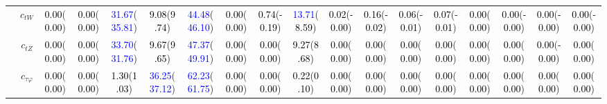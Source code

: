 \documentclass{article}
\begin{document}
\begin{landscape}
\begin{table}[H]
\begin{tabular}{|c|c|c|c|c|c|c|c|c|c|c|c|c|c|c|c|c|c|}
 & $c_{tW}$ & \textcolor{black}{0.00}(\textcolor{black}{0.00}) & \textcolor{black}{0.00}(\textcolor{black}{0.00}) & \textcolor{blue}{31.67}(\textcolor{blue}{35.81}) & \textcolor{black}{9.08}(\textcolor{black}{9.74}) & \textcolor{blue}{44.48}(\textcolor{blue}{46.10}) & \textcolor{black}{0.00}(\textcolor{black}{0.00}) & \textcolor{black}{0.74}(\textcolor{black}{-0.19}) & \textcolor{blue}{13.71}(\textcolor{black}{8.59}) & \textcolor{black}{0.02}(\textcolor{black}{-0.00}) & \textcolor{black}{0.16}(\textcolor{black}{-0.02}) & \textcolor{black}{0.06}(\textcolor{black}{-0.01}) & \textcolor{black}{0.07}(\textcolor{black}{-0.01}) & \textcolor{black}{0.00}(\textcolor{black}{0.00}) & \textcolor{black}{0.00}(\textcolor{black}{-0.00}) & \textcolor{black}{0.00}(\textcolor{black}{-0.00}) & \textcolor{black}{0.00}(\textcolor{black}{-0.00})\\ \cline{2-18}
 & $c_{tZ}$ & \textcolor{black}{0.00}(\textcolor{black}{0.00}) & \textcolor{black}{0.00}(\textcolor{black}{0.00}) & \textcolor{blue}{33.70}(\textcolor{blue}{31.76}) & \textcolor{black}{9.67}(\textcolor{black}{9.65}) & \textcolor{blue}{47.37}(\textcolor{blue}{49.91}) & \textcolor{black}{0.00}(\textcolor{black}{0.00}) & \textcolor{black}{0.00}(\textcolor{black}{0.00}) & \textcolor{black}{9.27}(\textcolor{black}{8.68}) & \textcolor{black}{0.00}(\textcolor{black}{0.00}) & \textcolor{black}{0.00}(\textcolor{black}{0.00}) & \textcolor{black}{0.00}(\textcolor{black}{0.00}) & \textcolor{black}{0.00}(\textcolor{black}{0.00}) & \textcolor{black}{0.00}(\textcolor{black}{0.00}) & \textcolor{black}{0.00}(\textcolor{black}{0.00}) & \textcolor{black}{0.00}(\textcolor{black}{-0.00}) & \textcolor{black}{0.00}(\textcolor{black}{0.00})\\ \cline{2-18}
 & $c_{\tau \varphi}$ & \textcolor{black}{0.00}(\textcolor{black}{0.00}) & \textcolor{black}{0.00}(\textcolor{black}{0.00}) & \textcolor{black}{1.30}(\textcolor{black}{1.03}) & \textcolor{blue}{36.25}(\textcolor{blue}{37.12}) & \textcolor{blue}{62.23}(\textcolor{blue}{61.75}) & \textcolor{black}{0.00}(\textcolor{black}{0.00}) & \textcolor{black}{0.00}(\textcolor{black}{0.00}) & \textcolor{black}{0.22}(\textcolor{black}{0.10}) & \textcolor{black}{0.00}(\textcolor{black}{0.00}) & \textcolor{black}{0.00}(\textcolor{black}{0.00}) & \textcolor{black}{0.00}(\textcolor{black}{0.00}) & \textcolor{black}{0.00}(\textcolor{black}{0.00}) & \textcolor{black}{0.00}(\textcolor{black}{0.00}) & \textcolor{black}{0.00}(\textcolor{black}{0.00}) & \textcolor{black}{0.00}(\textcolor{black}{0.00}) & \textcolor{black}{0.00}(\textcolor{black}{0.00})\\ \cline{2-18}

\end{tabular}
\end{table}
\end{landscape}
\end{document}
